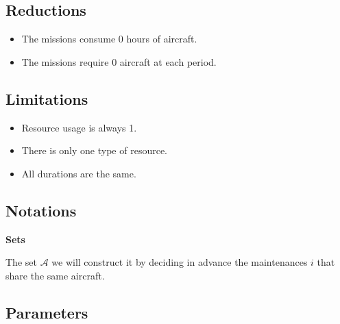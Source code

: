 \documentclass[a4paper,11pt]{article}
\begin{document}
    \subsection{Reductions}

    \begin{itemize}
        \item The missions consume 0 hours of aircraft.
        \item The missions require 0 aircraft at each period.
    \end{itemize}

    \subsection{Limitations}

    \begin{itemize}
        \item Resource usage is always 1.
        \item There is only one type of resource.
        \item All durations are the same.
    \end{itemize}

    \subsection{Notations}

    \textbf{Sets}


    \vskip 0.3cm

    The set $\mathcal{A}$ we will construct it by deciding in advance the maintenances $i$ that share the same aircraft.

    \subsection{Parameters}
\end{document}
